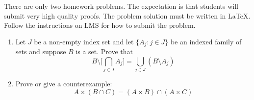 \documentclass{article}
\begin{document}

There are only two homework problems. The expectation is that students
will submit very high quality proofs. The problem solution must be written
in LaTeX. Follow the instructions on LMS for how to submit the problem.


\begin{enumerate}

\item Let $J$ be a non-empty index set and let $\{A_j:j \in J\}$ be an indexed family of sets and suppose $B$ is a set. 
Prove that $$B \setminus \Big[ 
\bigcap_{j \in J} A_j \Big]= \bigcup_{j \in J} \left(B \setminus A_j\right)$$  


\item Prove or give a counterexample: 
$$A \times \left(B \cap C \right)
= \left(A \times B \right) \cap \left( A \times C \right)$$




\end{enumerate}
\end{document}
